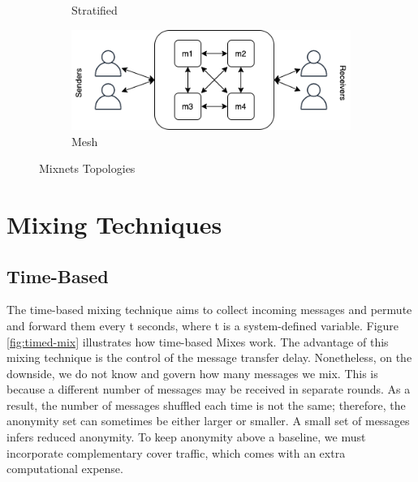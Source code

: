 \documentclass[logo,msc,cyber]{infthesis}   %
\begin{document}
\begin{figure}[h!]
\begin{subfigure}[b]{0.45\textwidth}
        \caption{Stratified}
        \label{fig:stratified}
    \end{subfigure}
    \hfill
    \begin{subfigure}[b]{0.45\textwidth}
        \centering
        \includegraphics[width=\textwidth]{figures/topologies/mesh.png}
        \caption{Mesh}
        \label{fig:mesh}
    \end{subfigure}
       \caption{Mixnets Topologies}
       \label{fig:mixnets-topologies}
\end{figure}

\section{Mixing Techniques}

\subsection{Time-Based}
The time-based mixing technique aims to collect incoming messages and permute
and forward them every t seconds\cite{diaz2003generalising}, where t is a
system-defined variable. Figure \ref{fig:timed-mix} illustrates how time-based
Mixes work. The advantage of this mixing technique is the control of the message
transfer delay. Nonetheless, on the downside, we do not know and govern how many
messages we mix. This is because a different number of messages may be received
in separate rounds. As a result, the number of messages shuffled each time is
not the same; therefore, the anonymity set can sometimes be either larger or
smaller. A small set of messages infers reduced anonymity. To keep anonymity
above a baseline, we must incorporate complementary cover traffic, which comes
with an extra computational expense.
\end{document}
